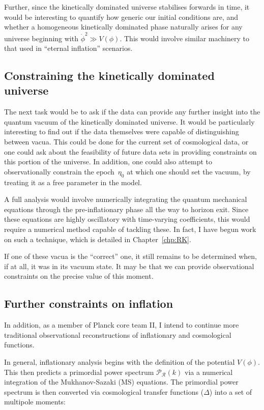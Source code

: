 Further, since the kinetically dominated universe stabilises forwards in time, it would be interesting to quantify how generic our initial conditions are, and whether a homogeneous kinetically dominated phase naturally arises for any universe beginning with \(\dot{\phi}^2\gg V(\phi)\). This would involve similar machinery to that used in ``eternal inflation'' scenarios.


\subsection*{Constraining the kinetically dominated universe}

The next task would be to ask if the data can provide any further insight into the quantum vacuum of the kinetically dominated universe. It would be particularly interesting to find out if the data themselves were capable of distinguishing between vacua. This could be done for the current set of cosmological data, or one could ask about the feasibility of future data sets in providing constraints on this portion of the universe. In addition, one could also attempt to observationally constrain the epoch~\(\eta_0\) at which one should set the vacuum, by treating it as a free parameter in the model.

A full analysis would involve numerically integrating the quantum mechanical equations through the pre-inflationary phase all the way to horizon exit. Since these equations are highly oscillatory with time-varying coefficients, this would require a numerical method capable of tackling these. In fact, I have begun work on such a technique, which is detailed in Chapter~\ref{chp:RK}.

If one of these vacua is the ``correct'' one, it still remains to be determined when, if at all, it was in its vacuum state. It may be that we can provide observational constraints on the precise value of this moment.

\subsection*{Further constraints on inflation}
In addition, as a member of Planck core team II, I intend to continue more traditional observational reconstructions of inflationary and cosmological functions.

In general, inflationary analysis begins with the definition of the potential \(V(\phi)\). This then predicts a primordial power spectrum \(\mathcal{P}_\mathcal{R}(k)\) via a numerical integration of the Mukhanov-Sazaki (MS) equations. The primordial power spectrum is then converted via cosmological transfer functions (\(\Delta\)) into a set of multipole moments:

